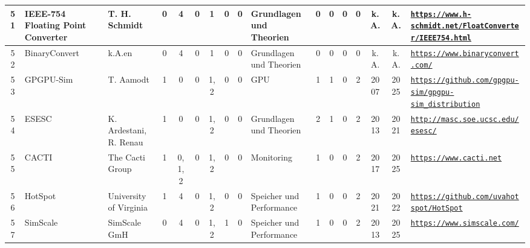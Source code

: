 \begin{landscape}
\begin{longtable}{|c|p{1cm}|p{1.3cm}|c|c|c|c|c|c|p{1.3cm}|c|c|c|c|c|c|p{2cm}|}
    51 & IEEE-754 Floating Point Converter & T. H. Schmidt & 0 & 4 & 0 & 1 & 0 & 0 & Grundlagen und Theorien & 0 & 0 & 0 & 0 & k.A. & k.A. & \href{https://www.h-schmidt.net/FloatConverter/IEEE754.html}{\nolinkurl{https://www.h-schmidt.net/FloatConverter/IEEE754.html}} \\ \hline
    52 & BinaryConvert & k.A.en & 0 & 4 & 0 & 1 & 0 & 0 & Grundlagen und Theorien & 0 & 0 & 0 & 0 & k.A. & k.A. & \href{https://www.binaryconvert.com/}{\nolinkurl{https://www.binaryconvert.com/}} \\ \hline
    53 & GPGPU-Sim & T. Aamodt & 1 & 0 & 0 & 1,2 & 0 & 0 & GPU & 1 & 1 & 0 & 2 & 2007 & 2025 & \href{https://github.com/gpgpu-sim/gpgpu-sim\_distribution}{\nolinkurl{https://github.com/gpgpu-sim/gpgpu-sim\_distribution}} \\ \hline
    54 & ESESC & K. Ardestani, R. Renau & 1 & 0 & 0 & 1,2 & 0 & 0 & Grundlagen und Theorien & 2 & 1 & 0 & 2 & 2013 & 2021 & \href{http://masc.soe.ucsc.edu/esesc/}{\nolinkurl{http://masc.soe.ucsc.edu/esesc/}} \\ \hline
    55 & CACTI & The Cacti Group & 1 & 0,1,2 & 0 & 1,2 & 0 & 0 & Monitoring & 1 & 0 & 0 & 2 & 2017 & 2025 & \href{https://www.cacti.net}{\nolinkurl{https://www.cacti.net}} \\ \hline
    56 & HotSpot & University of Virginia & 1 & 4 & 0 & 1,2 & 0 & 0 & Speicher und Performance & 1 & 0 & 0 & 2 & 2021 & 2022 & \href{https://github.com/uvahotspot/HotSpot}{\nolinkurl{https://github.com/uvahotspot/HotSpot}} \\ \hline
    57 & SimScale & SimScale GmH & 0 & 4 & 0 & 1,2 & 1 & 0 & Speicher und Performance & 1 & 0 & 0 & 2 & 2013 & 2025 & \href{https://www.simscale.com/}{\nolinkurl{https://www.simscale.com/}} \\ \hline     
\end{longtable}
\end{landscape}
